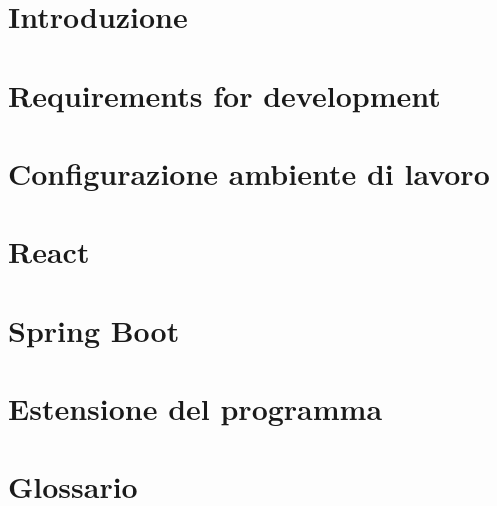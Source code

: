 \documentclass[a4paper, oneside, openany, dvipsnames, table]{article}
\begin{document}
\copertina{}
\newpage

\newpage
\tableofcontents
\newpage
\listoffigures
\newpage
\listoftables

\newpage
\newpage
\section{Introduzione}
	

\newpage
\section{Requirements for development}


\newpage
\section{Configurazione ambiente di lavoro}


\newpage
\section{React}


\newpage
\section{Spring Boot}


\newpage
\section{Estensione del programma}


\appendix
{}

\newpage
\section{Glossario}

\end{document}
